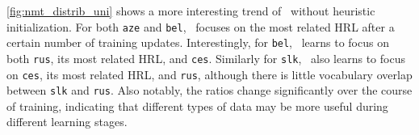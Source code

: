 
\autoref{fig:nmt_distrib_uni} shows a more interesting trend of \dds~without heuristic initialization.
For both \texttt{aze} and \texttt{bel}, \dds~focuses on the most related HRL after a certain number of training updates.
Interestingly, for \texttt{bel}, \dds~learns to focus on both \texttt{rus}, its most related HRL, and \texttt{ces}. Similarly for \texttt{slk}, \dds~also learns to focus on \texttt{ces}, its most related HRL, and \texttt{rus}, although there is little vocabulary overlap between \texttt{slk} and \texttt{rus}.
Also notably, the ratios change  significantly over the course of training, indicating that different types of data may be more useful during different learning stages.




